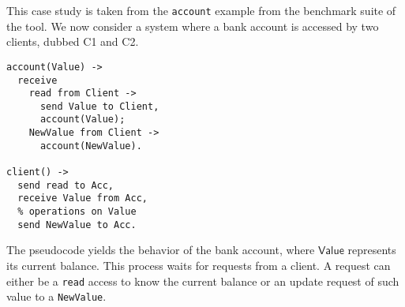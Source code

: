 This case study is taken from the \texttt{account} example from the benchmark 
suite of the tool.
We now consider a system where a bank account is accessed
by two clients, dubbed C1 and C2.
% 

\begin{lstlisting}
account(Value) ->
  receive
    read from Client ->
      send Value to Client,
      account(Value);
    NewValue from Client ->
      account(NewValue).

client() ->
  send read to Acc,
  receive Value from Acc,
  % operations on Value
  send NewValue to Acc.
\end{lstlisting}

The pseudocode yields the behavior of the bank account,
where $\mathsf{Value}$ represents its current balance.
%
This process waits for requests from a client.
%
A request can either be a \lstinline{read} access to know
the current balance or an update request of such value to a
\lstinline{NewValue}.

